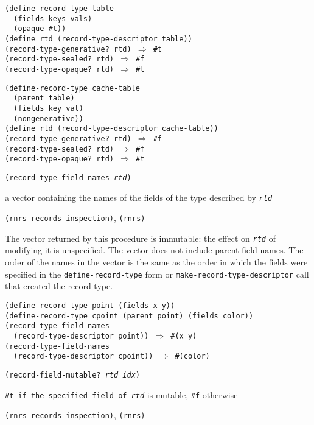 \begin{alltt}
(define-record-type table
  (fields keys vals)
  (opaque \#{}t))
(define rtd (record-type-descriptor table))
(record-type-generative? rtd) \(\Rightarrow\) \#{}t
(record-type-sealed? rtd) \(\Rightarrow\) \#{}f
(record-type-opaque? rtd) \(\Rightarrow\) \#{}t

(define-record-type cache-table
  (parent table)
  (fields key val)
  (nongenerative))
(define rtd (record-type-descriptor cache-table))
(record-type-generative? rtd) \(\Rightarrow\) \#{}f
(record-type-sealed? rtd) \(\Rightarrow\) \#{}f
(record-type-opaque? rtd) \(\Rightarrow\) \#{}t
\end{alltt}

\begin{description}

\label{records_s38}\item[procedure] \texttt{(record-type-field-names \textit{rtd})}



\item[returns] a vector containing the names of the fields of the type described by \texttt{\textit{rtd}}


\item[libraries] \texttt{(rnrs records inspection)}, \texttt{(rnrs)}
\end{description}


The vector returned by this procedure is immutable: the effect on \texttt{\textit{rtd}}
of modifying it is unspecified.
The vector does not include parent field names.
The order of the names in the vector is the same as the order in which the
fields were specified in the \texttt{define-record-type} form or
\texttt{make-record-type-descriptor} call that created the record type.


\begin{alltt}
(define-record-type point (fields x y))
(define-record-type cpoint (parent point) (fields color))
(record-type-field-names
  (record-type-descriptor point)) \(\Rightarrow\) \#{}(x y)
(record-type-field-names
  (record-type-descriptor cpoint)) \(\Rightarrow\) \#{}(color)
\end{alltt}

\begin{description}

\label{records_s39}\item[procedure] \texttt{(record-field-mutable? \textit{rtd} \textit{idx})}



\item[returns] \texttt{\#{}t if the specified field of \textit{rtd}} is mutable, \texttt{\#{}f} otherwise


\item[libraries] \texttt{(rnrs records inspection)}, \texttt{(rnrs)}
\end{description}

